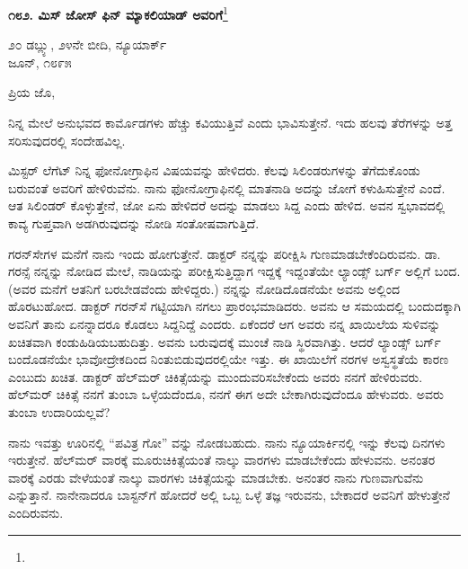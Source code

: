\begin{center}
\textbf{೧೮೨. ಮಿಸ್ ಜೋಸ್ ಫಿನ್ ಮ್ಯಾಕಲಿಯಾಡ್ ಅವರಿಗೆ}\footnote{}
\end{center}

\vspace{-0.5cm}

\begin{flushright}
೨೦ ಡಬ್ಲ್ಯು, ೨೪ನೇ ಬೀದಿ, ನ್ಯೂಯಾರ್ಕ್\\ಜೂನ್, ೧೮೯೫
\end{flushright}

\vspace{-0.3cm}

\noindent
ಪ್ರಿಯ ಜೊ,

ನಿನ್ನ ಮೇಲೆ ಅನುಭವದ ಕಾರ್ಮೊಡಗಳು ಹೆಚ್ಚು ಕವಿಯುತ್ತಿವೆ ಎಂದು ಭಾವಿಸುತ್ತೇನೆ. ಇದು ಹಲವು ತೆರೆಗಳನ್ನು ಅತ್ತ ಸರಿಸುವುದರಲ್ಲಿ ಸಂದೇಹವಿಲ್ಲ.

ಮಿಸ್ಟರ್ ಲೆಗೆಟ್ ನಿನ್ನ ಫೋನೋಗ್ರಾಫಿನ ವಿಷಯವನ್ನು ಹೇಳಿದರು. ಕೆಲವು ಸಿಲಿಂಡರುಗಳನ್ನು ತೆಗೆದುಕೊಂಡು ಬರುವಂತೆ ಅವರಿಗೆ ಹೇಳಿರುವೆನು. ನಾನು ಫೋನೋಗ್ರಾಫಿನಲ್ಲಿ ಮಾತನಾಡಿ ಅದನ್ನು ಜೋಗೆ ಕಳುಹಿಸುತ್ತೇನೆ ಎಂದೆ. ಆತ ಸಿಲಿಂಡರ್‌ ಕೊಳ್ಳುತ್ತೇನೆ, ಜೋ ಏನು ಹೇಳಿದರೆ ಅದನ್ನು ಮಾಡಲು ಸಿದ್ದ ಎಂದು ಹೇಳಿದ. ಅವನ ಸ್ವಭಾವದಲ್ಲಿ ಕಾವ್ಯ ಗುಪ್ತವಾಗಿ ಅಡಗಿರುವುದನ್ನು ನೋಡಿ ಸಂತೋಷವಾಗುತ್ತಿದೆ.

ಗರನ್‌ಸೇಗಳ ಮನೆಗೆ ನಾನು ಇಂದು ಹೋಗುತ್ತೇನೆ. ಡಾಕ್ಟರ್ ನನ್ನನ್ನು ಪರೀಕ್ಷಿಸಿ ಗುಣಮಾಡಬೇಕೆಂದಿರುವನು. ಡಾ. ಗರನ್ಸೆ ನನ್ನನ್ನು ನೋಡಿದ ಮೇಲೆ, ನಾಡಿಯನ್ನು ಪರೀಕ್ಷಿಸುತ್ತಿದ್ದಾಗ ಇದ್ದಕ್ಕೆ ಇದ್ದಂತೆಯೇ ಲ್ಯಾಂಡ್ಸ್ ಬರ್ಗ್ ಅಲ್ಲಿಗೆ ಬಂದ. (ಅವರ ಮನೆಗೆ ಆತನಿಗೆ ಬರಬೇಡವೆಂದು ಹೇಳಿದ್ದರು.) ನನ್ನನ್ನು ನೋಡಿದೊಡನೆಯೇ ಅವನು ಅಲ್ಲಿಂದ ಹೊರಟುಹೋದ. ಡಾಕ್ಟರ್‌ ಗರನ್‌ಸೆ ಗಟ್ಟಿಯಾಗಿ ನಗಲು ಪ್ರಾರಂಭಮಾಡಿದರು. ಅವನು ಆ ಸಮಯದಲ್ಲಿ ಬಂದುದಕ್ಕಾಗಿ ಅವನಿಗೆ ತಾನು ಏನನ್ನಾದರೂ ಕೊಡಲು ಸಿದ್ದನಿದ್ದೆ ಎಂದರು. ಏಕೆಂದರೆ ಆಗ ಅವರು ನನ್ನ ಖಾಯಿಲೆಯ ಸುಳಿವನ್ನು ಖಚಿತವಾಗಿ ಕಂಡುಹಿಡಿಯಬಹುದಿತ್ತು. ಅವನು ಬರುವುದಕ್ಕೆ ಮುಂಚೆ ನಾಡಿ ಸ್ಥಿರವಾಗಿತ್ತು. ಆದರೆ ಲ್ಯಾಂಡ್ಸ್ ಬರ್ಗ್ ಬಂದೊಡನೆಯೇ ಭಾವೋದ್ರೇಕದಿಂದ ನಿಂತುಬಿಡುವುದರಲ್ಲಿಯೇ ಇತ್ತು. ಈ ಖಾಯಿಲೆಗೆ ನರಗಳ ಅಸ್ವಸ್ಥತೆಯೆ  ಕಾರಣ ಎಂಬುದು ಖಚಿತ. ಡಾಕ್ಟರ್ ಹೆಲ್‌ಮರ್‌ ಚಿಕಿತ್ಸೆಯನ್ನು ಮುಂದುವರಿಸಬೇಕೆಂದು ಅವರು ನನಗೆ ಹೇಳಿರುವರು. ಹೆಲ್‌ಮರ್‌ ಚಿಕಿತ್ಸೆ ನನಗೆ ತುಂಬಾ ಒಳ್ಳೆಯದೆಂದೂ, ನನಗೆ ಈಗ ಅದೇ ಬೇಕಾಗಿರುವುದೆಂದೂ ಹೇಳುವರು. ಅವರು ತುಂಬಾ ಉದಾರಿಯಲ್ಲವೆ?

ನಾನು ಇವತ್ತು ಊರಿನಲ್ಲಿ “ಪವಿತ್ರ ಗೋ” ವನ್ನು ನೋಡಬಹುದು. ನಾನು ನ್ಯೂಯಾರ್ಕಿನಲ್ಲಿ ಇನ್ನು ಕೆಲವು ದಿನಗಳು ಇರುತ್ತೇನೆ. ಹೆಲ್‌ಮ‌ರ್ ವಾರಕ್ಕೆ ಮೂರು\break ಚಿಕಿತ್ಸೆಯಂತೆ ನಾಲ್ಕು ವಾರಗಳು ಮಾಡಬೇಕೆಂದು ಹೇಳುವನು. ಅನಂತರ ವಾರಕ್ಕೆ ಎರಡು ವೇಳೆಯಂತೆ ನಾಲ್ಕು ವಾರಗಳು ಚಿಕಿತ್ಸೆಯನ್ನು ಮಾಡಬೇಕು. ಅನಂತರ ನಾನು ಗುಣವಾಗುವೆನು ಎನ್ನುತ್ತಾನೆ. ನಾನೇನಾದರೂ ಬಾಸ್ಟನ್‌ಗೆ ಹೋದರೆ ಅಲ್ಲಿ ಒಬ್ಬ ಒಳ್ಳೆ ತಜ್ಞ  ಇರುವನು, ಬೇಕಾದರೆ ಅವನಿಗೆ ಹೇಳುತ್ತೇನೆ ಎಂದಿರುವನು.

\vspace{0.1cm}

